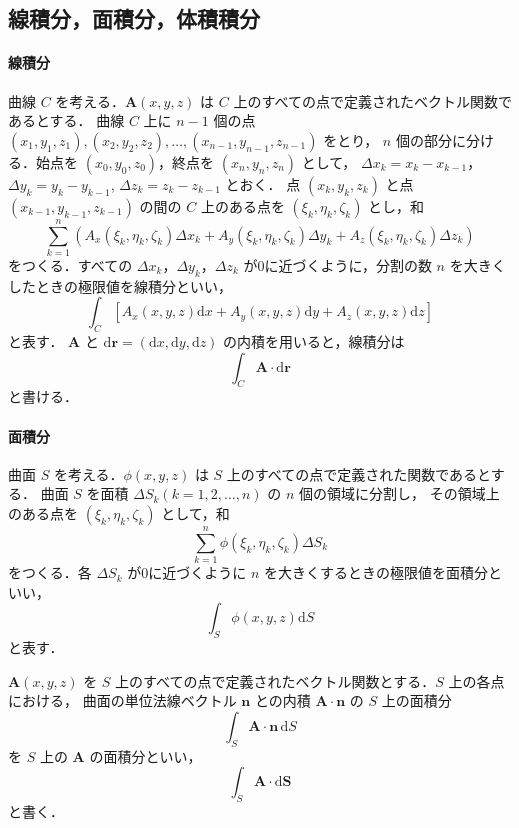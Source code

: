 \documentclass[11pt, a4paper]{ltjsarticle}
\numberwithin{equation}{section}
\begin{document}
\subsection{線積分，面積分，体積積分}
\paragraph{線積分}
曲線 $C$ を考える．$\bm{A}\left( x, y, z \right)$ は $C$ 上のすべての点で定義されたベクトル関数であるとする．
曲線 $C$ 上に $n - 1$ 個の点 $\left( x_1, y_1, z_1 \right), \left( x_2, y_2, z_2 \right), \dots, \left( x_{n - 1}, y_{n - 1}, z_{n - 1} \right)$ をとり，
$n$ 個の部分に分ける．始点を $\left( x_0, y_0, z_0 \right)$，終点を $\left( x_n, y_n, z_n \right)$ として，
$\Delta x_k = x_k - x_{k - 1}$，$\Delta y_k = y_k - y_{k - 1}$, $\Delta z_k = z_k - z_{k - 1}$ とおく．
点 $\left( x_k, y_k, z_k \right)$ と点 $\left( x_{k - 1}, y_{k - 1}, z_{k - 1} \right)$ の間の $C$ 上のある点を $\left( \xi_k, \eta_k, \zeta_k \right)$ とし，和
\[
  \sum_{k = 1}^{n} \left( A_x \left(\xi_k, \eta_k, \zeta_k \right) \Delta x_k + A_y \left(\xi_k, \eta_k, \zeta_k \right) \Delta y_k + A_z \left(\xi_k, \eta_k, \zeta_k \right) \Delta z_k \right)
\]
をつくる．すべての $\Delta x_k$，$\Delta y_k$，$\Delta z_k$ が0に近づくように，分割の数 $n$ を大きくしたときの極限値を線積分といい，
\[
  \int_C \left[ A_x \left(x, y, z \right) \mathrm{d}x + A_y \left(x, y, z \right) \mathrm{d}y + A_z \left(x, y, z \right) \mathrm{d}z \right]
\]
と表す．
$\bm{A}$ と $\mathrm{d}\bm{r} = \left( \mathrm{d}x, \mathrm{d}y, \mathrm{d}z \right)$ の内積を用いると，線積分は
\[
  \int_C \bm{A} \cdot \mathrm{d}\bm{r}
\]
と書ける．
\paragraph{面積分}
曲面 $S$ を考える．$\phi \left( x, y, z \right)$ は $S$ 上のすべての点で定義された関数であるとする．
曲面 $S$ を面積 $\Delta S_k \left( k = 1, 2, \dots, n \right)$ の $n$ 個の領域に分割し，
その領域上のある点を $\left( \xi_k, \eta_k, \zeta_k \right)$ として，和
\[
  \sum_{k = 1}^{n} \phi \left( \xi_k, \eta_k, \zeta_k \right) \Delta S_k
\]
をつくる．各 $\Delta S_k$ が0に近づくように $n$ を大きくするときの極限値を面積分といい，
\[
  \int_S \phi \left(x, y, z \right) \mathrm{d}S
\]
と表す．

$\bm{A} \left( x, y, z \right) $ を $S$ 上のすべての点で定義されたベクトル関数とする．$S$ 上の各点における，
曲面の単位法線ベクトル $\bm{n}$ との内積 $\bm{A} \cdot \bm{n}$ の $S$ 上の面積分
\[
  \int_S \bm{A} \cdot \bm{n} \, \mathrm{d}S
\]
を $S$ 上の $\bm{A}$ の面積分といい，
\[
  \int_S \bm{A} \cdot \mathrm{d}\bm{S}
\]
と書く．
\end{document}
